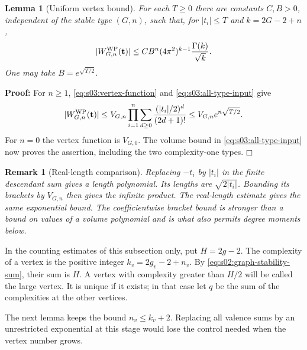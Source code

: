 \documentclass[a4paper,10pt]{article}
\numberwithin{equation}{section}
\theoremstyle{paperplain}
\newtheorem{lmm}[thm]{Lemma}
\theoremstyle{paperremark}
\newtheorem{rmk}{Remark}[section]
\theoremstyle{paperplain}
\newenvironment{prf}{\noindent \textbf{Proof: }}{\hfill $\mdlgwhtsquare$\par\addvspace{0.5\baselineskip}}
\begin{document}
\begin{lmm}[Uniform vertex bound]
\label{lmm:s03:vertex-bound}
For each $T\geq0$ there are constants $C,B>0$, independent of the
stable type $(G,n)$, such that, for $|t_i|\leq T$ and $k=2G-2+n$,
\begin{equation}
\label{eq:s03:vertex-bound}
|W^{\rm WP}_{G,n}(\mathbf t)|
\leq CB^n(4\pi^2)^{k-1}\frac{\Gamma(k)}{\sqrt{k}}.
\end{equation}
One may take $B=e^{\sqrt{T/2}}$.
\end{lmm}
\begin{prf}
For $n\geq1$, \eqref{eq:s03:vertex-function} and
\eqref{eq:s03:all-type-input} give
\[
|W^{\rm WP}_{G,n}(\mathbf t)|
\leq V_{G,n}\prod_{i=1}^n
 \sum_{d\geq0}\frac{(|t_i|/2)^d}{(2d+1)!}
\leq V_{G,n}e^{n\sqrt{T/2}}.
\]
For $n=0$ the vertex function is $V_{G,0}$. The volume bound in
\eqref{eq:s03:all-type-input} now proves the assertion, including
the two complexity-one types.
\end{prf}

\begin{rmk}[Real-length comparison]
Replacing $-t_i$ by $|t_i|$ in the finite descendant sum gives a
length polynomial. Its lengths are $\sqrt{2|t_i|}$.
Bounding its brackets by $V_{G,n}$ then gives the infinite product.
The real-length estimate
\cite[Lemma~14(1)]{SW25} gives the same exponential bound.
The coefficientwise bracket bound is stronger than a bound on values
of a volume polynomial and is what also permits degree moments below.
\end{rmk}

In the counting estimates of this subsection only, put $H=2g-2$.
The complexity of a vertex is the positive integer $k_v=2g_v-2+n_v$.
By \eqref{eq:s02:graph-stability-sum}, their sum is $H$.
A vertex with complexity greater than $H/2$ will be called the large
vertex. It is unique if it exists; in that case let $q$ be the sum
of the complexities at the other vertices.

The next lemma keeps the bound $n_v\leq k_v+2$. Replacing all valence
sums by an unrestricted exponential at this stage would lose the
control needed when the vertex number grows.
\end{document}
